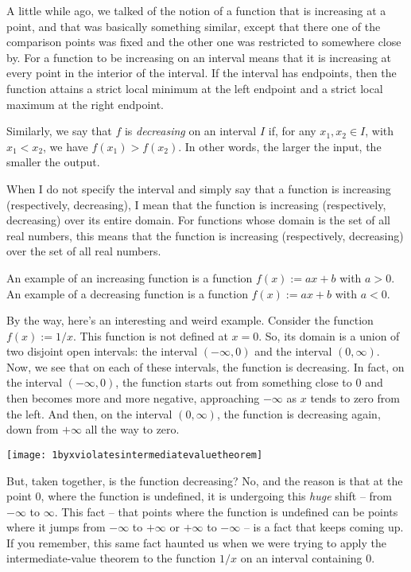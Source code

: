 \documentclass{amsart}
\begin{document}
A little while ago, we talked of the notion of a function that is
increasing at a point, and that was basically something similar,
except that there one of the comparison points was fixed and the other
one was restricted to somewhere close by. For a function to be
increasing on an interval means that it is increasing at every point
in the interior of the interval. If the interval has endpoints, then
the function attains a strict local minimum at the left endpoint and a
strict local maximum at the right endpoint.

Similarly, we say that $f$ is {\em decreasing} on an interval $I$ if,
for any $x_1, x_2 \in I$, with $x_1 < x_2$, we have $f(x_1) >
f(x_2)$. In other words, the larger the input, the smaller the output.

When I do not specify the interval and simply say that a function is
increasing (respectively, decreasing), I mean that the function is
increasing (respectively, decreasing) over its entire domain. For
functions whose domain is the set of all real numbers, this means that
the function is increasing (respectively, decreasing) over the set of
all real numbers.

An example of an increasing function is a function $f(x) := ax + b$
with $a > 0$. An example of a decreasing function is a function $f(x)
:= ax + b$ with $a < 0$.

By the way, here's an interesting and weird example. Consider the
function $f(x) := 1/x$. This function is not defined at $x = 0$. So,
its domain is a union of two disjoint open intervals: the interval
$(-\infty,0)$ and the interval $(0,\infty)$. Now, we see that on each
of these intervals, the function is decreasing. In fact, on the
interval $(-\infty,0)$, the function starts out from something close
to $0$ and then becomes more and more negative, approaching $-\infty$
as $x$ tends to zero from the left. And then, on the interval
$(0,\infty)$, the function is decreasing again, down from $+\infty$
all the way to zero.

\texttt{[image: 1byxviolatesintermediatevaluetheorem]}

But, taken together, is the function decreasing? No, and the reason is
that at the point $0$, where the function is undefined, it is
undergoing this {\em huge} shift -- from $-\infty$ to $\infty$. This
fact -- that points where the function is undefined can be points
where it jumps from $-\infty$ to $+\infty$ or $+\infty$ to $-\infty$
-- is a fact that keeps coming up. If you remember, this same fact
haunted us when we were trying to apply the intermediate-value theorem
to the function $1/x$ on an interval containing $0$.
\end{document}
